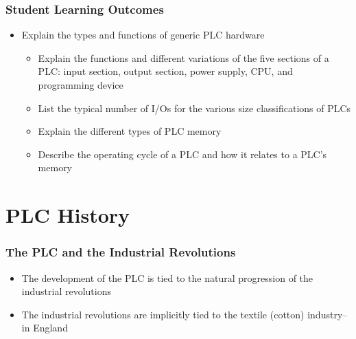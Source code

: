 \begin{frame}
    \frametitle{Student Learning Outcomes}
    \begin{itemize}[<+- | alert@+>]
        \item[4.]{Explain the types and functions of generic PLC hardware}
        \begin{itemize}
            \item[a.]{Explain the functions and different variations of the five sections of a PLC: input section, output section, power supply, CPU, and programming device}
            \item[b.] List the typical number of I/Os for the various size classifications of PLCs
            \item[c.] Explain the different types of PLC memory
            \item[d.] Describe the operating cycle of a PLC and how it relates to a PLC’s memory
        \end{itemize}
    \end{itemize}
\end{frame}

\section{PLC History}

\begin{frame}
    \frametitle{The PLC and the Industrial Revolutions}

    \begin{itemize}
        \item The development of the PLC is tied to the natural progression of the industrial revolutions
        \item The industrial revolutions are implicitly tied to the textile (cotton) industry--in England
    \end{itemize}
\end{frame}

